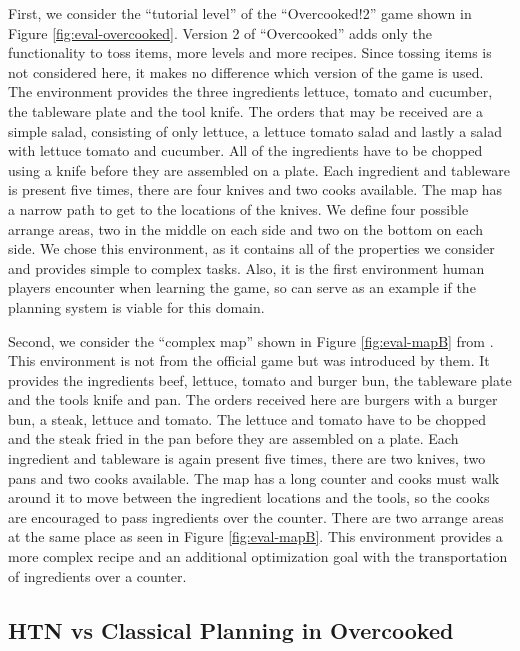 First, we consider the ``tutorial level'' of the ``Overcooked!2'' game shown in Figure \ref{fig:eval-overcooked}.
Version 2 of ``Overcooked'' adds only the functionality to toss items, more levels and more recipes.
Since tossing items is not considered here, it makes no difference which version of the game is used.
The environment provides the three ingredients lettuce, tomato and cucumber, the tableware plate and the tool knife.
The orders that may be received are a simple salad, consisting of only lettuce, a lettuce tomato salad and lastly a salad with lettuce tomato and cucumber.
All of the ingredients have to be chopped using a knife before they are assembled on a plate.
Each ingredient and tableware is present five times, there are four knives and two cooks available.
The map has a narrow path to get to the locations of the knives.
We define four possible arrange areas, two in the middle on each side and two on the bottom on each side.
We chose this environment, as it contains all of the properties we consider and provides simple to complex tasks.
Also, it is the first environment human players encounter when learning the game, so can serve as an example if the planning system is viable for this domain.


Second, we consider the ``complex map'' shown in Figure \ref{fig:eval-mapB} from \cite{yuxinliuPlanningOvercookedGame2020}.
This environment is not from the official game but was introduced by them.
It provides the ingredients beef, lettuce, tomato and burger bun, the tableware plate and the tools knife and pan.
The orders received here are burgers with a burger bun, a steak, lettuce and tomato.
The lettuce and tomato have to be chopped and the steak fried in the pan before they are assembled on a plate.
Each ingredient and tableware is again present five times, there are two knives, two pans and two cooks available.
The map has a long counter and cooks must walk around it to move between the ingredient locations and the tools, so the cooks are encouraged to pass ingredients over the counter.
There are two arrange areas at the same place as seen in Figure \ref{fig:eval-mapB}.
This environment provides a more complex recipe and an additional optimization goal with the transportation of ingredients over a counter.

\subsection{HTN vs Classical Planning in Overcooked}
\label{sec:evaluation-htn}


